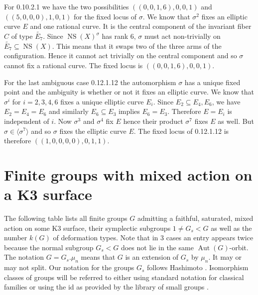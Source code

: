 \documentclass[a4paper]{amsart}
\theoremstyle{definition}
\theoremstyle{plain}
\DeclareMathOperator{\NS}{NS}
\DeclareMathOperator{\Aut}{Aut}
\begin{document}
For  0.10.2.1 we have the two possibilities $((0, 0, 1, 6), 0, 0, 1)$ and  $((5, 0, 0, 0), 1, 0, 1)$ for the fixed locus of $\sigma$. We know that $\sigma^2$ fixes an elliptic curve $E$ and one rational curve. It is the central component of the invariant fiber $C$ of type $\tilde{E_7}$. Since $\NS(X)^\sigma$ has rank $6$, $\sigma$ must act non-trivially on $\tilde{E_7} \subseteq \NS(X)$.
This means that it swaps two of the three arms of the configuration. Hence it cannot act trivially on the central component and so $\sigma$ cannot fix a rational curve.
The fixed locus is $((0, 0, 1, 6), 0, 0, 1)$.

For the last ambiguous case 0.12.1.12 the automorphism $\sigma$ has a unique fixed point and the ambiguity is whether or not it fixes an elliptic curve. We know that $\sigma^i$ for $i=2,3,4,6$ fixes a unique elliptic curve $E_i$.
Since $E_2\subseteq E_4,E_6$, we have $E_2=E_4=E_6$ and similarly $E_6 \subseteq E_3$ implies $E_6=E_3$. Therefore $E=E_i$ is independent of $i$.
Now $\sigma^3$ and $\sigma^4$ fix $E$ hence their product $\sigma^7$ fixes $E$ as well. But $\sigma \in \langle \sigma^7\rangle$ and so $\sigma$ fixes the elliptic curve $E$. The fixed locus of 0.12.1.12 is therefore $((1, 0, 0, 0, 0), 0, 1, 1)$.
 


\newpage
\appendix

%
\section{Finite groups with mixed action on a K3 surface}
\label{appendixA}
The following table lists all finite groups $G$ admitting a faithful, saturated, mixed action on some K3 surface, their symplectic subgroups $1\neq G_s < G$ as well as the number $k(G)$ of deformation types.
Note that in 3 cases an entry appears twice because
the normal subgroup $G_s < G$ does not lie in the same $\Aut(G)$-orbit.
The notation $G = G_s.\mu_n$ means that $G$ is an extension of $G_s$ by $\mu_n$. It may or may not split. Our notation for the groups $G_s$ follows Hashimoto \cite{Hashimoto2012}. Isomorphism classes of groups will be referred to
either using standard notation for classical families or
using the id as provided by the library of small groups \cite{Besche2002}.
\end{document}
